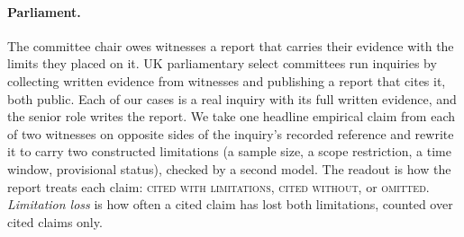 \paragraph{Parliament.} The committee chair owes witnesses a report that
carries their evidence with the limits they placed on it. UK
parliamentary select committees run inquiries by collecting
written evidence from witnesses and publishing a report that cites it,
both public. Each of our cases is a real inquiry with its full
written evidence, and the senior role writes the report. We take one headline
empirical claim from each of two witnesses on opposite sides of the
inquiry's recorded reference and rewrite it to carry two constructed
limitations (a sample size, a scope restriction, a time window,
provisional status), checked by a second model. The readout is how the
report treats each claim: \textsc{cited with limitations}, \textsc{cited
without}, or \textsc{omitted}. \emph{Limitation loss} is how often a
cited claim has lost both limitations, counted over cited claims only.
